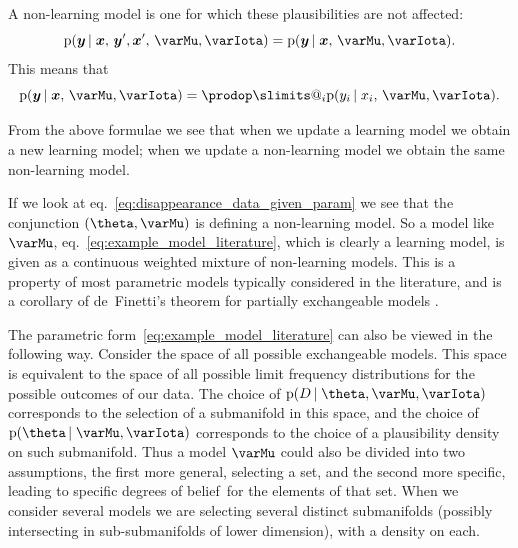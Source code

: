 \documentclass[\ifafour a4paper,12pt,\else a5paper,10pt,\fi%
onecolumn,oneside,article,%
british%
]{memoir}
\makeatletter
\theoremstyle{remark}
\theoremstyle{innote}
\def\prod{\DOTSI\prodop\slimits@}
\newcommand*{\citep}{\parencites}
\newcommand*{\pf}{\mathrm{p}}%
\renewcommand*{\|}{\nonscript\,\vert\nonscript\;\mathopen{}}
\newcommand*{\sect}{\S}%
\newcommand*{\eqn}{eq.}%
\newcommand*{\dobs}{degrees of belief}
\newcommand*{\yM}{\varMu}
\newcommand*{\yx}{\bm{x}}
\newcommand*{\yy}{\bm{y}}
\newcommand*{\yI}{\varIota}
\newcommand*{\yD}{D}
\newcommand*{\yHm}{\yM}
\makeatother
\begin{document}
A non-learning model is one for which these plausibilities are not affected:
\begin{equation}
  \label{eq:non-learning_def}
  \pf(\yy  \| \yx,\, \yy', \yx',\, \yM, \yI) =
  \pf(\yy  \| \yx,\, \yM, \yI).
\end{equation}
This means that 
\begin{equation}
  \label{eq:non-learning_indep}
  \pf(\yy  \| \yx,\, \yM, \yI) = \prod_i  \pf(y_i \| x_i,\, \yM, \yI).
\end{equation}

From the above formulae we see that when we update a learning model we
obtain a new learning model; when we update a non-learning model we obtain
the same non-learning model.

\medskip

If we look at \eqn~\eqref{eq:disappearance_data_given_param} we see that
the conjunction $(\theta,\yHm)$ is defining a non-learning model. So a
model like $\yHm$, \eqn~\eqref{eq:example_model_literature}, which is
clearly a learning model, is given as a continuous weighted mixture of
non-learning models. This is a property of most parametric models typically
considered in the literature, and is a corollary of de~Finetti's theorem
for partially exchangeable models
\citep{definetti1938}[\sect~4.6]{bernardoetal1994_r2000}.

The parametric form~\eqref{eq:example_model_literature} can also be viewed
in the following way. Consider the space of all possible exchangeable
models. This space is equivalent to the space of all possible limit
frequency distributions for the possible outcomes of our data. The choice
of $\pf(\yD \| \theta,\yHm,\yI)$ corresponds to the selection of a
submanifold in this space, and the choice of $\pf(\theta \|\yHm,\yI)$
corresponds to the choice of a plausibility density on such submanifold.
Thus a model $\yHm$ could also be divided into two assumptions, the first
more general, selecting a set, and the second more specific, leading to
specific \dobs\ for the elements of that set. When we consider several
models we are selecting several distinct submanifolds (possibly
intersecting in sub-submanifolds of lower dimension), with a density on
each.
\end{document}
